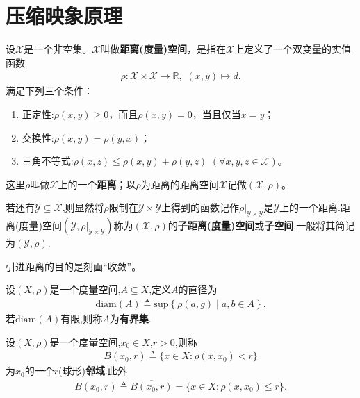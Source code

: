 \documentclass[../../main.tex]{subfiles}%
\begin{document}
\section{压缩映象原理}

\begin{definition}
设$\mathscr{X}$是一个非空集。$\mathscr{X}$叫做\textbf{距离(度量)空间}，是指在$\mathscr{X}$上定义了一个双变量的实值函数
\begin{align*}
\rho:\mathscr{X}\times \mathscr{X}\to \mathbb{R},\,\,(x,y)\mapsto d.
\end{align*}
满足下列三个条件：
\begin{enumerate}[(1)]
\item 正定性:$\rho(x,y)\geqslant 0$，而且$\rho(x,y)=0$，当且仅当$x=y$；
\item 交换性:$\rho(x,y)=\rho(y,x)$；
\item 三角不等式:$\rho(x,z)\leqslant \rho(x,y)+\rho(y,z)$ $(\forall x,y,z\in \mathscr{X})$。
\end{enumerate}
这里$\rho$叫做$\mathscr{X}$上的一个\textbf{距离}；以$\rho$为距离的距离空间$\mathscr{X}$记做$(\mathscr{X},\rho)$。

若还有$\mathscr{Y}\subseteq \mathscr{X}$,则显然将$\rho$限制在$\mathscr{Y}\times \mathscr{Y}$上得到的函数记作$\rho|_{\mathscr{Y}\times \mathscr{Y}}$是$\mathscr{Y}$上的一个距离.距离(度量)空间$(\mathscr{Y},\rho|_{\mathscr{Y}\times \mathscr{Y}})$称为$(\mathscr{X},\rho)$的\textbf{子距离(度量)空间}或\textbf{子空间},一般将其简记为$(\mathscr{Y},\rho)$.
\end{definition}
\begin{remark}
引进距离的目的是刻画“收敛”。
\end{remark}

\begin{definition}
设$(X,\rho)$是一个度量空间,$A\subseteq X$,定义$A$的直径为
\begin{align*}
\text{diam}(A)\triangleq \mathrm{sup}\left\{ \rho \left( a,g \right) \mid a,b\in A \right\} .
\end{align*}
若$\text{diam}(A)$有限,则称$A$为\textbf{有界集}.
\end{definition}

\begin{definition}
设$(X,\rho)$是一个度量空间,$x_0\in X$,$r>0$,则称
\begin{align*}
B(x_0,r)\triangleq \{x\in X: \rho(x,x_0)<r\}
\end{align*}
为$x_0$的一个$r$(球形)\textbf{邻域}.此外
\begin{align*}
\overline{B}(x_0,r)\triangleq \overline{B(x_0,r)}=\{x\in X: \rho(x,x_0)\leqslant r\}.
\end{align*}
\end{definition}
\end{document}
